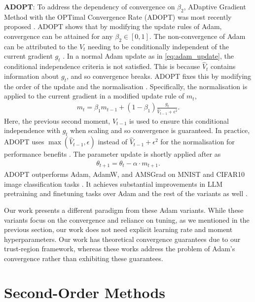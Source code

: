 \textbf{ADOPT}: To address the dependency of convergence on $\beta_2$, ADaptive Gradient Method with the OPTimal Convergence Rate (ADOPT) was most recently proposed \citep{taniguchi2024adopt}. ADOPT shows that by modifying the update rules of Adam, convergence can be attained for any $\beta_2 \in [0, 1]$. The non-convergence of Adam can be attributed to the $V_t$ needing to be conditionally independent of the current gradient $g_t$ \citep{taniguchi2024adopt}. In a normal Adam update as in \cref{eq:adam_update}, the conditional independence criteria is not satisfied. This is because $\hat{V}_t$ contains information about $g_t$, and so convergence breaks. 
ADOPT fixes this by modifying the order of the update and the normalisation \citep{taniguchi2024adopt}. Specifically, the normalisation is applied to the current gradient in a modified update rule of $m_t$, 
\begin{align}
    m_t = \beta_1 m_{t-1} + (1 - \beta_1) \frac{g_t}{\hat{V}_{t-1} + \epsilon^2}.
\end{align}
Here, the previous second moment, $V_{t-1}$ is used to ensure this conditional independence with $g_t$ when scaling and so convergence is guaranteed. In practice, ADOPT uses $\max(\hat{V}_{t-1}, \epsilon)$ instead of $\hat{V}_{t-1} + \epsilon^2$ for the normalisation for performance benefits \citep{taniguchi2024adopt}. The parameter update is shortly applied after as
\begin{align}
    \theta_{t+1} = \theta_{t} - \alpha \cdot m_{t+1}.
\end{align}
ADOPT outperforms Adam, AdamW, and AMSGrad on MNIST and CIFAR10 image classification tasks \citep{taniguchi2024adopt}.
It achieves substantial improvements in LLM pretraining and finetuning tasks over Adam and the rest of the variants as well \citep{taniguchi2024adopt}. 

Our work presents a different paradigm from these Adam variants. While these variants focus on the convergence and reliance on tuning, as we mentioned in the previous section, our work does not need explicit learning rate and moment hyperparameters. Our work has theoretical convergence guarantees due to our trust-region framework, whereas these works address the problem of Adam's convergence rather than exhibiting these guarantees.

\section{Second-Order Methods}
\label{sec:second_order_methods}

